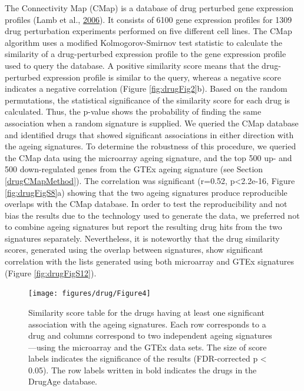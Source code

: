 \documentclass[12pt,twoside]{unicam}
\begin{document}
The Connectivity Map (CMap) is a database of drug perturbed gene expression profiles (Lamb et al., \protect\hyperlink{ref-Lamb2006}{2006}). It consists of 6100 gene expression profiles for 1309 drug perturbation experiments performed on five different cell lines. The CMap algorithm uses a modified Kolmogorov-Smirnov test statistic to calculate the similarity of a drug-perturbed expression profile to the gene expression profile used to query the database. A positive similarity score means that the drug-perturbed expression profile is similar to the query, whereas a negative score indicates a negative correlation (Figure \ref{fig:drugFig2}b). Based on the random permutations, the statistical significance of the similarity score for each drug is calculated. Thus, the p-value shows the probability of finding the same association when a random signature is supplied. We queried the CMap database and identified drugs that showed significant associations in either direction with the ageing signatures. To determine the robustness of this procedure, we queried the CMap data using the microarray ageing signature, and the top 500 up- and 500 down-regulated genes from the GTEx ageing signature (see Section \ref{drugCMapMethod}). The correlation was significant (r=0.52, p\textless2.2e-16, Figure \ref{fig:drugFigS8}a) showing that the two ageing signatures produce reproducible overlaps with the CMap database. In order to test the reproducibility and not bias the results due to the technology used to generate the data, we preferred not to combine ageing signatures but report the resulting drug hits from the two signatures separately. Nevertheless, it is noteworthy that the drug similarity scores, generated using the overlap between signatures, show significant correlation with the lists generated using both microarray and GTEx signatures (Figure \ref{fig:drugFigS12}).

\begin{figure}

{\centering \texttt{[image: figures/drug/Figure4]} 

}

\caption[Drug-Ageing signature similarity scores.]{Similarity score table for the drugs having at least one significant association with the ageing signatures. Each row corresponds to a drug and columns correspond to two independent ageing signatures—using the microarray and the GTEx data sets. The size of score labels indicates the significance of the results (FDR-corrected p < 0.05). The row labels written in bold indicates the drugs in the DrugAge database.}\label{fig:drugFig4}
\end{figure}
\end{document}
